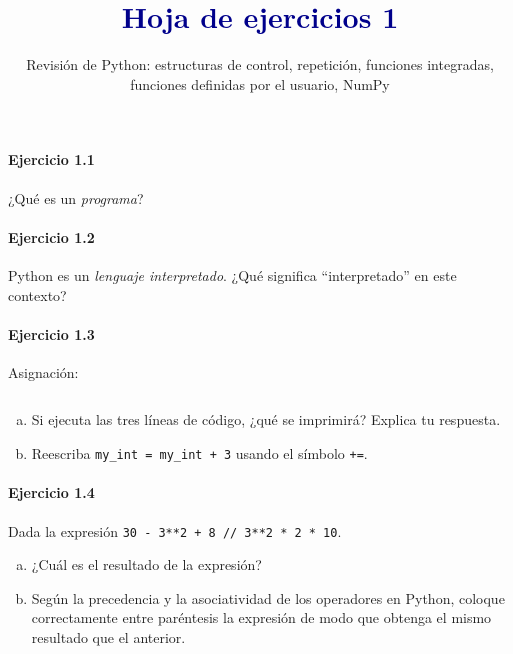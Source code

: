 


\title{\textcolor{DarkBlue}{Hoja de ejercicios 1}}
\subtitle{\color{DarkBlue}
  Revisión de Python:
  estructuras de control, repetición, 
  funciones integradas, funciones definidas por el usuario, NumPy
}



\maketitle

\paragraph{\color{DarkBlue}Ejercicio 1.1}
¿Qué es un \emph{programa}?

\paragraph{\color{DarkBlue}Ejercicio 1.2}
Python es un \emph{lenguaje interpretado}.
¿Qué significa ``interpretado'' en este contexto?

\paragraph{\color{DarkBlue}Ejercicio 1.3}
Asignación:
\begin{listing}[ht!]
	\inputminted{python}{1.3.py}
\end{listing}
\begin{enumerate}[(a)]
	\item

	      Si ejecuta las tres líneas de código, ¿qué se imprimirá?
	      Explica tu respuesta.

	\item

	      Reescriba \texttt{my_int = my_int + 3} usando el
	      símbolo \texttt{+=}.
\end{enumerate}

\paragraph{\color{DarkBlue}Ejercicio 1.4}
Dada la expresión
\texttt{30 - 3**2 + 8 // 3**2 * 2 * 10}.

\begin{enumerate}[(a)]
	\item

	      ¿Cuál es el resultado de la expresión?

	\item

	      Según la precedencia y la asociatividad de los operadores en
	      Python, coloque correctamente entre paréntesis la expresión
	      de modo que obtenga el mismo resultado que el anterior.
\end{enumerate}

